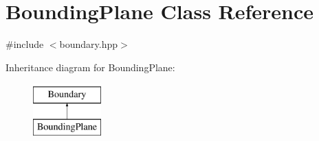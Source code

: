 \hypertarget{class_bounding_plane}{}\section{Bounding\+Plane Class Reference}
\label{class_bounding_plane}


{\ttfamily \#include $<$boundary.\+hpp$>$}

Inheritance diagram for Bounding\+Plane\+:\begin{figure}[H]
\begin{center}
\leavevmode
\includegraphics[height=2.000000cm]{class_bounding_plane}
\end{center}
\end{figure}
